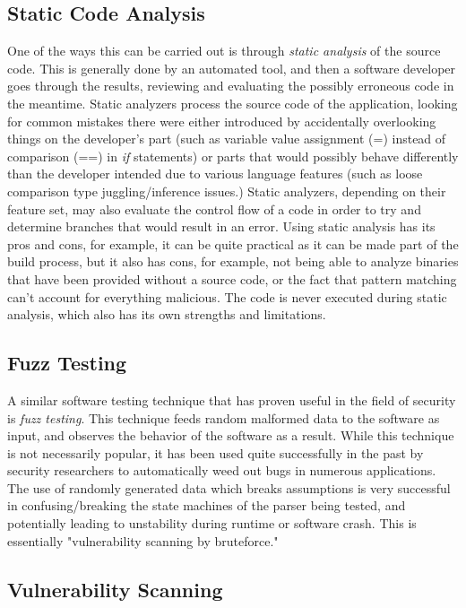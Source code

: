 \documentclass[a4paper,12pt]{article}
\begin{document}
\subsection{Static Code Analysis}
	
	One of the ways this can be carried out is through \textit{static analysis} of the source code. This is generally done by an automated tool, and then a software developer goes through the results, reviewing and evaluating the possibly erroneous code in the meantime. Static analyzers process the source code of the application, looking for common mistakes there were either introduced by accidentally overlooking things on the developer's part (such as variable value assignment (=) instead of comparison (==) in \textit{if} statements) or parts that would possibly behave differently than the developer intended due to various language features (such as loose comparison type juggling/inference issues.) Static analyzers, depending on their feature set, may also evaluate the control flow of a code in order to try and determine branches that would result in an error. Using static analysis has its pros and cons, for example, it can be quite practical as it can be made part of the build process, but it also has cons, for example, not being able to analyze binaries that have been provided without a source code, or the fact that pattern matching can't account for everything malicious. The code is never executed during static analysis, which also has its own strengths and limitations.
	
\subsection{Fuzz Testing}
	
	A similar software testing technique that has proven useful in the field of security is \textit{fuzz testing}. This technique feeds random malformed data to the software as input, and observes the behavior of the software as a result. While this technique is not necessarily popular, it has been used quite successfully in the past by security researchers to automatically weed out bugs in numerous applications.\cite{mzalewski15} The use of randomly generated data which breaks assumptions is very successful in confusing/breaking the state machines of the parser being tested, and potentially leading to unstability during runtime or software crash. This is essentially "vulnerability scanning by bruteforce."
	
\subsection{Vulnerability Scanning}
	
\end{document}

